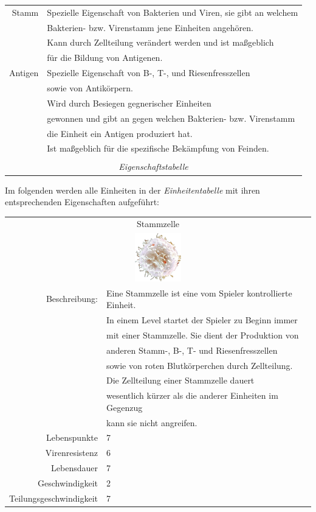 \documentclass[11pt]{article}
\begin{document}
\begin{tabular}{|r|l|}
Stamm		& Spezielle Eigenschaft von Bakterien und Viren, sie gibt an welchem\\
			& Bakterien- bzw. Virenstamm jene Einheiten angeh\"oren.\\
			& Kann durch Zellteilung ver\"andert werden und ist maßgeblich\\
			& f\"ur die Bildung von Antigenen.\\\hline
Antigen		& Spezielle Eigenschaft von B-, T-, und Riesenfresszellen\\
			& sowie von Antik\"orpern.\\
			& Wird durch Besiegen gegnerischer Einheiten\\
			& gewonnen und gibt an gegen welchen Bakterien- bzw. Virenstamm\\
			& die Einheit ein Antigen produziert hat.\\
			& Ist maßgeblich f\"ur die spezifische Bek\"ampfung von Feinden.\\\hline
\multicolumn{2}{c}{}\\
\multicolumn{2}{c}{\textit{\large{Eigenschaftstabelle}}}\\
\end{tabular}
\newline\newline\newline
Im folgenden werden alle Einheiten in der \textit{Einheitentabelle} mit ihren entsprechenden Eigenschaften aufgef\"uhrt:

\begin{tabular}{|r|l|}
\hline
\multicolumn{2}{c}{Stammzelle}\\
\multicolumn{2}{c}{\includegraphics[width=2cm]{stemcellorig.png}}\\\hline\hline
Beschreibung:	& Eine Stammzelle ist eine vom Spieler kontrollierte Einheit.\\
			& In einem Level startet der Spieler zu Beginn immer\\
			& mit einer Stammzelle. Sie dient der Produktion von\\
			& anderen Stamm-, B-, T- und Riesenfresszellen\\
			& sowie von roten Blutk\"orperchen durch Zellteilung.\\
			& Die Zellteilung einer Stammzelle dauert\\
			& wesentlich k\"urzer als die anderer Einheiten im Gegenzug\\
			& kann sie nicht angreifen.\\\hline
Lebenspunkte	& 7\\\hline
Virenresistenz	& 6\\\hline
Lebensdauer		& 7\\\hline
Geschwindigkeit	& 2\\\hline
Teilungsgeschwindigkeit	& 7\\\hline
\end{tabular}
\end{document}
